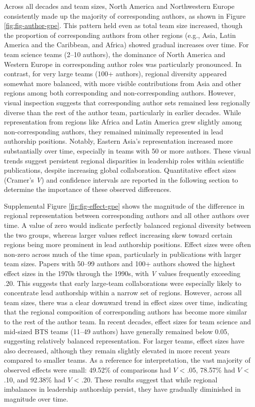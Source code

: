 \documentclass[
  man,floatsintext]{apa7}
\begin{document}
Across all decades and team sizes, North America and Northwestern Europe
consistently made up the majority of corresponding authors, as shown in
Figure \ref{fig:fig-author-gpe}. This pattern held even as total
team size increased, though the proportion of corresponding authors from
other regions (e.g., Asia, Latin America and the Caribbean, and Africa)
showed gradual increases over time. For team science teams (2--10
authors), the dominance of North America and Western Europe in
corresponding author roles was particularly pronounced. In contrast, for
very large teams (100+ authors), regional diversity appeared somewhat
more balanced, with more visible contributions from Asia and other
regions among both corresponding and non-corresponding authors. However,
visual inspection suggests that corresponding author sets remained less
regionally diverse than the rest of the author team, particularly in
earlier decades. While representation from regions like Africa and Latin
America grew slightly among non-corresponding authors, they remained
minimally represented in lead authorship positions. Notably, Eastern
Asia's representation increased more substantially over time, especially
in teams with 50 or more authors. These visual trends suggest persistent
regional disparities in leadership roles within scientific publications,
despite increasing global collaboration. Quantitative effect sizes
(Cramer's \emph{V}) and confidence intervals are reported in the following
section to determine the importance of these observed differences.

Supplemental Figure \ref{fig:fig-effect-gpe} shows the magnitude of the difference in
regional representation between corresponding authors and all other
authors over time. A value of zero would indicate perfectly balanced
regional diversity between the two groups, whereas larger values reflect
increasing skew toward certain regions being more prominent in lead
authorship positions. Effect sizes were often non-zero across much of
the time span, particularly in publications with larger team sizes.
Papers with 50--99 authors and 100+ authors showed the highest effect
sizes in the 1970s through the 1990s, with \emph{V} values frequently
exceeding .20. This suggests that early large-team collaborations were
especially likely to concentrate lead authorship within a narrow set of
regions. However, across all team sizes, there was a clear downward
trend in effect sizes over time, indicating that the regional
composition of corresponding authors has become more similar to the rest
of the author team. In recent decades, effect sizes for team science and
mid-sized BTS teams (11--49 authors) have generally remained below 0.05,
suggesting relatively balanced representation. For larger teams, effect
sizes have also decreased, although they remain slightly elevated in
more recent years compared to smaller teams. As a reference for
interpretation, the vast majority of observed effects were small:
49.52\% of
comparisons had \(V\) \textless{} .05,
78.57\% had \(V\) \textless{}
.10, and 92.38\%
had \(V\) \textless{} .20. These results suggest that while regional imbalances in
leadership authorship persist, they have gradually diminished in
magnitude over time.
\end{document}

